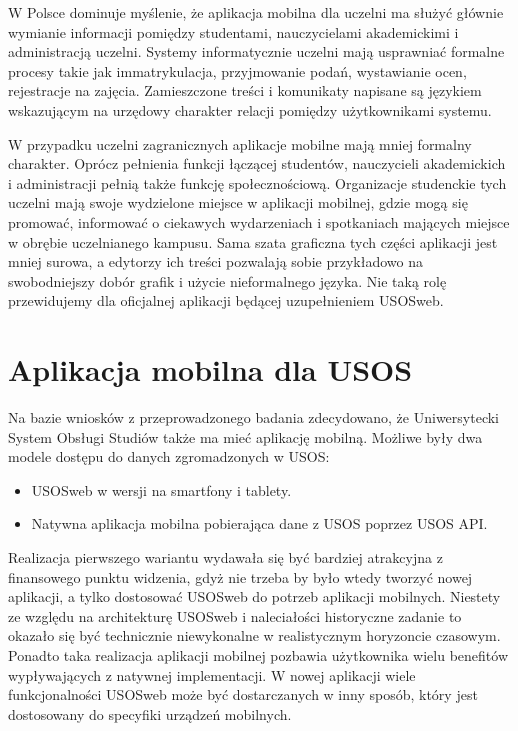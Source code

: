 \documentclass{pracamgr}
\begin{document}
W Polsce dominuje myślenie, że aplikacja mobilna dla uczelni ma służyć głównie
wymianie informacji pomiędzy studentami, nauczycielami akademickimi i administracją
uczelni. Systemy informatycznie uczelni mają usprawniać formalne procesy takie jak
immatrykulacja, przyjmowanie podań, wystawianie ocen, rejestracje na zajęcia.
Zamieszczone treści i komunikaty napisane są językiem wskazującym na urzędowy
charakter relacji pomiędzy użytkownikami systemu.

W przypadku uczelni zagranicznych aplikacje mobilne mają mniej formalny
charakter. Oprócz pełnienia funkcji łączącej studentów, nauczycieli akademickich
i administracji pełnią także funkcję społecznościową. Organizacje studenckie tych
uczelni mają swoje wydzielone miejsce w aplikacji mobilnej, gdzie mogą się
promować, informować o ciekawych wydarzeniach i spotkaniach mających miejsce
w obrębie uczelnianego kampusu. Sama szata graficzna tych części aplikacji
jest mniej surowa, a edytorzy ich treści pozwalają sobie przykładowo na
swobodniejszy dobór grafik i użycie nieformalnego języka. Nie taką rolę
przewidujemy dla oficjalnej aplikacji będącej uzupełnieniem USOSweb.

\section{Aplikacja mobilna dla USOS}

Na bazie wniosków z przeprowadzonego badania zdecydowano, że Uniwersytecki
System Obsługi Studiów także ma mieć aplikację mobilną. Możliwe były dwa
modele dostępu do danych zgromadzonych w USOS:

\begin{itemize}
	\item USOSweb w wersji na smartfony i tablety.
	\item Natywna aplikacja mobilna pobierająca dane z USOS poprzez USOS API.
\end{itemize}

Realizacja pierwszego wariantu wydawała się być bardziej atrakcyjna z finansowego
punktu widzenia, gdyż nie trzeba by było wtedy tworzyć nowej aplikacji, a tylko
dostosować USOSweb do potrzeb aplikacji mobilnych. Niestety ze względu na architekturę
USOSweb i naleciałości historyczne zadanie to okazało się być technicznie niewykonalne
w realistycznym horyzoncie czasowym. Ponadto taka realizacja aplikacji mobilnej
pozbawia użytkownika wielu benefitów wypływających z natywnej implementacji.
W nowej aplikacji wiele funkcjonalności USOSweb może być dostarczanych w inny
sposób, który jest dostosowany do specyfiki urządzeń mobilnych.
\end{document}
